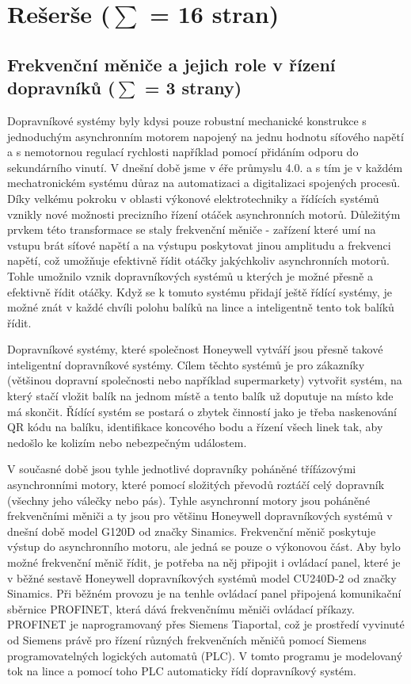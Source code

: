 \chapter{Rešerše ($\sum$ = 16 stran)} \label{chap:Rešerše}
\section{Frekvenční měniče a jejich role v řízení dopravníků ($\sum$ = 3 strany)}\label{sec:FrekvencniMeniceAJejichRole}

Dopravníkové systémy byly kdysi pouze robustní mechanické konstrukce s jednoduchým asynchronním motorem napojený na jednu hodnotu síťového napětí a s nemotornou regulací rychlosti například pomocí přidáním odporu do sekundárního vinutí. V dnešní době jsme v éře průmyslu 4.0. a s tím je v každém mechatronickém systému důraz na automatizaci a digitalizaci spojených procesů. Díky velkému pokroku v oblasti výkonové elektrotechniky a řídících systémů vznikly nové možnosti precizního řízení otáček asynchronních motorů. Důležitým prvkem této transformace se staly frekvenční měniče - zařízení které umí na vstupu brát síťové napětí a na výstupu poskytovat jinou amplitudu a frekvenci napětí, což umožňuje efektivně řídit otáčky jakýchkoliv asynchronních motorů. Tohle umožnilo vznik dopravníkových systémů u kterých je možné přesně a efektivně řídit otáčky. Když se k tomuto systému přidají ještě řídící systémy, je možné znát v každé chvíli polohu balíků na lince a inteligentně tento tok balíků řídit.

Dopravníkové systémy, které společnost Honeywell vytváří jsou přesně takové inteligentní dopravníkové systémy. Cílem těchto systémů je pro zákazníky (většinou dopravní společnosti nebo například supermarkety) vytvořit systém, na který stačí vložit balík na jednom místě a tento balík už doputuje na místo kde má skončit. Řídící systém se postará o zbytek činností jako je třeba naskenování QR kódu na balíku, identifikace koncového bodu a řízení všech linek tak, aby nedošlo ke kolizím nebo nebezpečným událostem. 

V současné době jsou tyhle jednotlivé dopravníky poháněné třífázovými asynchronními motory, které pomocí složitých převodů roztáčí celý dopravník (všechny jeho válečky nebo pás). Tyhle asynchronní motory jsou poháněné frekvenčními měniči a ty jsou pro většinu Honeywell dopravníkových systémů v dnešní době model G120D od značky Sinamics. Frekvenční měnič poskytuje výstup do asynchronního motoru, ale jedná se pouze o výkonovou část. Aby bylo možné frekvenční měnič řídit, je potřeba na něj připojit i ovládací panel, které je v běžné sestavě Honeywell dopravníkových systémů model CU240D-2 od značky Sinamics. Při běžném provozu je na tenhle ovládací panel připojená komunikační sběrnice PROFINET, která dává frekvenčnímu měniči ovládací příkazy. PROFINET je naprogramovaný přes Siemens Tiaportal, což je prostředí vyvinuté od Siemens právě pro řízení různých frekvenčních měničů pomocí Siemens programovatelných logických automatů (PLC). V tomto programu je modelovaný tok na lince a pomocí toho PLC automaticky řídí dopravníkový systém.
\cite{SinamicsG120Dpage}

